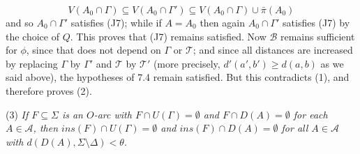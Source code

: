 \begin{equation*}
V(A_0 \cap \Gamma) \subseteq V(A_0 \cap \Gamma') \subseteq V(A_0 \cap \Gamma) \cup \bar{\pi}(A_0)
\end{equation*}
and so $A_0 \cap \Gamma'$ satisfies (J7); while if $A = A_0$ then again $A_0 \cap \Gamma'$ satisfies (J7) by the choice of $Q$. This proves that (J7) remains satisfied. Now $\mathcal{B}$ remains sufficient for $\phi$, since that does not depend on $\Gamma$ or $\mathcal{T}$; and since all distances are increased by replacing $\Gamma$ by $\Gamma'$ and $\mathcal{T}$ by $\mathcal{T}'$ (more precisely, $d'(a', b') \ge d(a, b)$ as we said above), the hypotheses of 7.4 remain satisfied. But this contradicts (1), and therefore proves (2).

\hspace*{12pt}(3) \textit{If $F \subseteq \Sigma$ is an $O$-arc with $F \cap U(\Gamma) = \emptyset$ and $F \cap D(A) = \emptyset$ for each $A \in \mathcal{A}$, then $ins(F) \cap U(\Gamma) = \emptyset$ and $ins(F) \cap D(A) = \emptyset$ for all $A \in \mathcal{A}$ with $d(D(A), \Sigma \setminus \Delta) < \theta$.}

